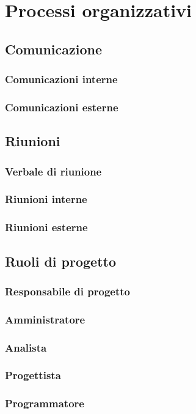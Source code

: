 \documentclass[NormeDiProgetto.tex]{subfiles}
\begin{document}
\chapter{Processi organizzativi}

\section{Comunicazione}
\subsection{Comunicazioni interne}
\subsection{Comunicazioni esterne}

\section{Riunioni}
\subsection{Verbale di riunione}
\subsection{Riunioni interne}
\subsection{Riunioni esterne}

\section{Ruoli di progetto}
\subsection{Responsabile di progetto}
\subsection{Amministratore}
\subsection{Analista}
\subsection{Progettista}
\subsection{Programmatore}
\end{document}
